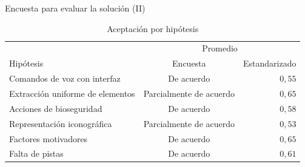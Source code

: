 \begin{frame}{Encuesta para evaluar la solución (II)}


\begin{table}
\scriptsize
\centering
\begin{tabular}{lcr}
\toprule
& \multicolumn{2}{c}{Promedio} \\
\cmidrule(lr){2-3}
Hipótesis                        & Encuesta                & Estandarizado \\
\midrule
Comandos de voz con interfaz     & De acuerdo              & $0,55$ \\
Extracción uniforme de elementos & Parcialmente de acuerdo & $0,65$ \\
Acciones de bioseguridad         & De acuerdo              & $0,58$ \\
Representación iconográfica      & Parcialmente de acuerdo & $0,53$ \\
Factores motivadores             & De acuerdo              & $0,65$ \\
Falta de pistas                  & De acuerdo              & $0,61$ \\
\bottomrule
\end{tabular}
\caption{Aceptación por hipótesis}
\end{table}

\end{frame}

